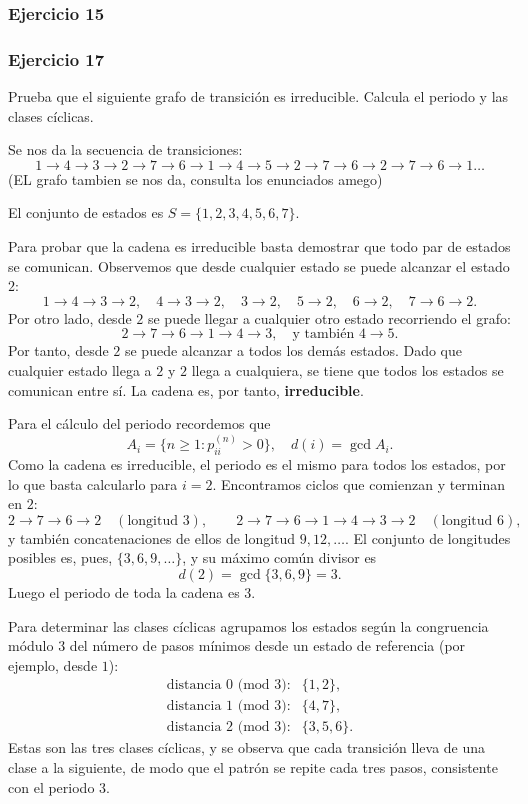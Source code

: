 \subsubsection{Ejercicio 15}
\subsubsection{Ejercicio 17}
\begin{exercise}
Prueba que el siguiente grafo de transición es irreducible. Calcula el periodo y las clases cíclicas.
\end{exercise}

Se nos da la secuencia de transiciones:
\[
1 \rightarrow 4 \rightarrow 3 \rightarrow 2 \rightarrow 7 \rightarrow 6 \rightarrow 1 \rightarrow 4 \rightarrow 5 \rightarrow 2 \rightarrow 7 \rightarrow 6 \rightarrow 2 \rightarrow 7 \rightarrow 6 \rightarrow 1 \dots
\]
(EL grafo tambien se nos da, consulta los enunciados amego)

El conjunto de estados es \(S=\{1,2,3,4,5,6,7\}\).

Para probar que la cadena es irreducible basta demostrar que todo par de estados se comunican. Observemos que desde cualquier estado se puede alcanzar el estado \(2\):
\[
1\to4\to3\to2,\quad 4\to3\to2,\quad 3\to2,\quad 5\to2,\quad 6\to2,\quad 7\to6\to2.
\]
Por otro lado, desde \(2\) se puede llegar a cualquier otro estado recorriendo el grafo:
\[
2\to7\to6\to1\to4\to3,\quad \text{y también } 4\to5.
\]
Por tanto, desde \(2\) se puede alcanzar a todos los demás estados. Dado que cualquier estado llega a \(2\) y \(2\) llega a cualquiera, se tiene que todos los estados se comunican entre sí. La cadena es, por tanto, \textbf{irreducible}.

Para el cálculo del periodo recordemos que
\[
A_i = \{n\ge1 : p_{ii}^{(n)} > 0\}, \quad d(i) = \gcd A_i.
\]
Como la cadena es irreducible, el periodo es el mismo para todos los estados, por lo que basta calcularlo para \(i=2\). Encontramos ciclos que comienzan y terminan en \(2\):
\[
2 \to 7 \to 6 \to 2 \quad (\text{longitud } 3), \qquad
2 \to 7 \to 6 \to 1 \to 4 \to 3 \to 2 \quad (\text{longitud } 6),
\]
y también concatenaciones de ellos de longitud \(9, 12, \dots\). El conjunto de longitudes posibles es, pues, \(\{3,6,9,\dots\}\), y su máximo común divisor es
\[
d(2) = \gcd\{3,6,9\} = 3.
\]
Luego el periodo de toda la cadena es \(3\).

Para determinar las clases cíclicas agrupamos los estados según la congruencia módulo \(3\) del número de pasos mínimos desde un estado de referencia (por ejemplo, desde \(1\)):
\[
\begin{array}{lcl}
\text{distancia 0 (mod 3):} & \{1,2\},\\
\text{distancia 1 (mod 3):} & \{4,7\},\\
\text{distancia 2 (mod 3):} & \{3,5,6\}.
\end{array}
\]
Estas son las tres clases cíclicas, y se observa que cada transición lleva de una clase a la siguiente, de modo que el patrón se repite cada tres pasos, consistente con el periodo \(3\).

